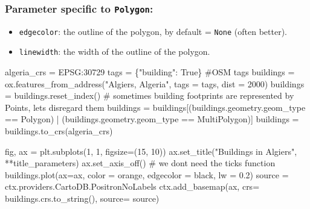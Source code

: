 \documentclass[
  letterpaper,
  DIV=11,
  numbers=noendperiod]{scrreprt}
\newenvironment{Shaded}{\begin{snugshade}}{\end{snugshade}}
\newcommand{\CommentTok}[1]{\textcolor[rgb]{0.37,0.37,0.37}{#1}}
\newcommand{\DecValTok}[1]{\textcolor[rgb]{0.68,0.00,0.00}{#1}}
\newcommand{\FloatTok}[1]{\textcolor[rgb]{0.68,0.00,0.00}{#1}}
\newcommand{\NormalTok}[1]{\textcolor[rgb]{0.00,0.23,0.31}{#1}}
\newcommand{\OperatorTok}[1]{\textcolor[rgb]{0.37,0.37,0.37}{#1}}
\newcommand{\StringTok}[1]{\textcolor[rgb]{0.13,0.47,0.30}{#1}}
\newcommand{\VariableTok}[1]{\textcolor[rgb]{0.07,0.07,0.07}{#1}}
\providecommand{\tightlist}{%
  \setlength{\itemsep}{0pt}\setlength{\parskip}{0pt}}\usepackage{longtable,booktabs,array}
\begin{document}
\hypertarget{parameter-specific-to-polygon}{%
\subsubsection{\texorpdfstring{Parameter specific to
\texttt{Polygon}:}{Parameter specific to Polygon:}}\label{parameter-specific-to-polygon}}

\begin{itemize}
\tightlist
\item
  \texttt{edgecolor}: the outline of the polygon, by default =
  \texttt{None} (often better).
\item
  \texttt{linewidth}: the width of the outline of the polygon.
\end{itemize}

\begin{Shaded}
\begin{Highlighting}[]
\NormalTok{algeria\_crs }\OperatorTok{=} \StringTok{\textquotesingle{}EPSG:30729\textquotesingle{}}
\NormalTok{tags }\OperatorTok{=}\NormalTok{ \{}\StringTok{"building"}\NormalTok{: }\VariableTok{True}\NormalTok{\} }\CommentTok{\#OSM tags}
\NormalTok{buildings }\OperatorTok{=}\NormalTok{ ox.features\_from\_address(}\StringTok{"Algiers, Algeria"}\NormalTok{, tags }\OperatorTok{=}\NormalTok{ tags, dist }\OperatorTok{=} \DecValTok{2000}\NormalTok{) }
\NormalTok{buildings }\OperatorTok{=}\NormalTok{ buildings.reset\_index()}
 \CommentTok{\# sometimes building footprints are represented by Points, let\textquotesingle{}s disregard them}
\NormalTok{buildings }\OperatorTok{=}\NormalTok{ buildings[(buildings.geometry.geom\_type }\OperatorTok{==} \StringTok{\textquotesingle{}Polygon\textquotesingle{}}\NormalTok{) }\OperatorTok{|}\NormalTok{ (buildings.geometry.geom\_type }\OperatorTok{==} \StringTok{\textquotesingle{}MultiPolygon\textquotesingle{}}\NormalTok{)]}
\NormalTok{buildings }\OperatorTok{=}\NormalTok{ buildings.to\_crs(algeria\_crs)}
\end{Highlighting}
\end{Shaded}

\begin{Shaded}
\begin{Highlighting}[]
\NormalTok{fig, ax }\OperatorTok{=}\NormalTok{ plt.subplots(}\DecValTok{1}\NormalTok{, }\DecValTok{1}\NormalTok{, figsize}\OperatorTok{=}\NormalTok{(}\DecValTok{15}\NormalTok{, }\DecValTok{10}\NormalTok{))}
\NormalTok{ax.set\_title(}\StringTok{"Buildings in Algiers"}\NormalTok{, }\OperatorTok{**}\NormalTok{title\_parameters)}
\NormalTok{ax.set\_axis\_off() }\CommentTok{\# we don\textquotesingle{}t need the ticks function}
\NormalTok{buildings.plot(ax}\OperatorTok{=}\NormalTok{ax, color }\OperatorTok{=} \StringTok{\textquotesingle{}orange\textquotesingle{}}\NormalTok{, edgecolor }\OperatorTok{=} \StringTok{\textquotesingle{}black\textquotesingle{}}\NormalTok{, lw }\OperatorTok{=} \FloatTok{0.2}\NormalTok{)}
\NormalTok{source }\OperatorTok{=}\NormalTok{ ctx.providers.CartoDB.PositronNoLabels}
\NormalTok{ctx.add\_basemap(ax, crs}\OperatorTok{=}\NormalTok{ buildings.crs.to\_string(), source}\OperatorTok{=}\NormalTok{ source)}
\end{Highlighting}
\end{Shaded}
\end{document}
